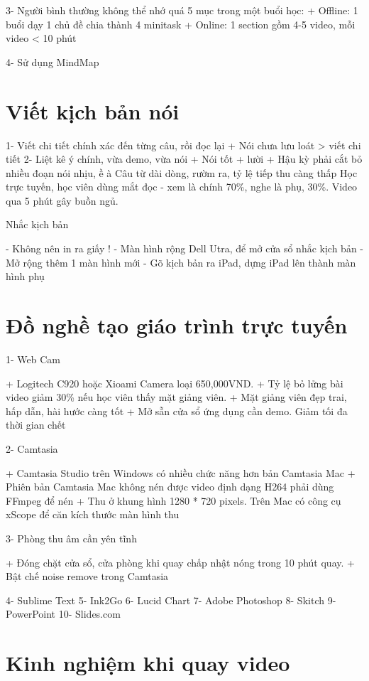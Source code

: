 3- Người bình thường không thể nhớ quá 5 mục trong một buổi học:
+ Offline: 1 buổi dạy 1 chủ đề chia thành 4 minitask
+ Online: 1 section gồm 4-5 video, mỗi video < 10 phút

4- Sử dụng MindMap

\section{Viết kịch bản nói}

1- Viết chi tiết chính xác đến từng câu, rồi đọc lại
+ Nói chưa lưu loát > viết chi tiết
2- Liệt kê ý chính, vừa demo, vừa nói
+ Nói tốt + lười
+ Hậu kỳ phải cắt bỏ nhiều đoạn nói nhịu, ề à
Câu từ dài dòng, rườm ra, tỷ lệ tiếp thu càng thấp
Học trực tuyến, học viên dùng mắt đọc - xem là chính 70\%, nghe là phụ, 30\%. Video qua 5 phút gây buồn ngủ.

Nhắc kịch bản

- Không nên in ra giấy !
- Màn hình rộng Dell Utra, để mở cửa sổ nhắc kịch bản
- Mở rộng thêm 1 màn hình mới
- Gõ kịch bản ra iPad, dựng iPad lên thành màn hình phụ

\section{Đồ nghề tạo giáo trình trực tuyến}

1- Web Cam

+ Logitech C920 hoặc Xioami Camera loại 650,000VND.
+ Tỷ lệ bỏ lửng bài video giảm 30\% nếu học viên thấy mặt giảng viên.
+ Mặt giảng viên đẹp trai, hấp dẫn, hài hước càng tốt
+ Mở sẵn cửa sổ ứng dụng cần demo. Giảm tối đa thời gian chết

2- Camtasia

+ Camtasia Studio trên Windows có nhiều chức năng hơn bản Camtasia Mac
+ Phiên bản Camtasia Mac không nén được video định dạng H264 phải dùng FFmpeg để nén
+ Thu ở khung hình 1280 * 720 pixels. Trên Mac có công cụ xScope để căn kích thước màn hình thu

3- Phòng thu âm cần yên tĩnh

+ Đóng chặt cửa sổ, cửa phòng khi quay chấp nhật nóng trong 10 phút quay.
+ Bật chế noise remove trong Camtasia

4- Sublime Text
5- Ink2Go
6- Lucid Chart
7- Adobe Photoshop
8- Skitch
9- PowerPoint
10- Slides.com

\section{Kinh nghiệm khi quay video}

